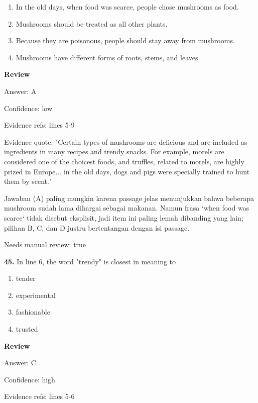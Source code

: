 \documentclass[12pt]{article}
\begin{document}
\begin{enumerate}[label=(\Alph*),leftmargin=*,itemsep=0.2em]
\item In the old days, when food was scarce, people chose mushrooms as food.
\item Mushrooms should be treated as all other plants.
\item Because they are poisonous, people should stay away from mushrooms.
\item Mushrooms have different forms of roots, stems, and leaves.
\end{enumerate}
\par
\begingroup
\setlength{\parskip}{0pt}
\setlength{\parindent}{0pt}
\textbf{Review}\par
Answer: A\par
Confidence: low\par
Evidence refs: lines 5-9\par
Evidence quote: "Certain types of mushrooms are delicious and are included as ingredients in many recipes and trendy snacks. For example, morels are considered one of the choicest foods, and truffles, related to morels, are highly prized in Europe... in the old days, dogs and pigs were specially trained to hunt them by scent."\par
Jawaban (A) paling mungkin karena passage jelas menunjukkan bahwa beberapa mushroom sudah lama dihargai sebagai makanan. Namun frasa `when food was scarce` tidak disebut eksplisit, jadi item ini paling lemah dibanding yang lain; pilihan B, C, dan D justru bertentangan dengan isi passage.\par
Needs manual review: true\par
\endgroup
\par
\vspace{0.25\baselineskip}
\noindent\textbf{45.} In line 6, the word "trendy" is closest in meaning to
\begin{enumerate}[label=(\Alph*),leftmargin=*,itemsep=0.2em]
\item tender
\item experimental
\item fashionable
\item trusted
\end{enumerate}
\par
\begingroup
\setlength{\parskip}{0pt}
\setlength{\parindent}{0pt}
\textbf{Review}\par
Answer: C\par
Confidence: high\par
Evidence refs: lines 5-6\par
\end{document}
